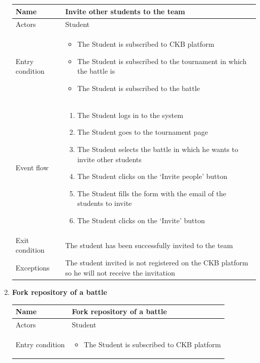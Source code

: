 \begin{enumerate}[label=UC\arabic*:]
    \begin{tabular}{|p{3cm}|p{8cm}|}
        \hline
        Name & Invite other students to the team \\
        \hline
        Actors & Student \\
        \hline
        Entry condition &
        \begin{itemize}
            \item The Student is subscribed to CKB platform
            \item The Student is subscribed to the tournament in which the battle is
            \item The Student is subscribed to the battle
        \end{itemize} \\
        \hline
        Event flow &
        \begin{enumerate}[label=\arabic*.]
            \item The Student logs in to the system
            \item The Student goes to the tournament page
            \item The Student selects the battle in which he wants to invite other students
            \item The Student clicks on the `Invite people' button
            \item The Student fills the form with the email of the students to invite
            \item The Student clicks on the `Invite' button
        \end{enumerate} \\
        \hline
        Exit condition & The student has been successfully invited to the team \\
        \hline
        Exceptions & The student invited is not registered on the CKB platform so he will not receive the invitation \\
        \hline
    \end{tabular}
    \item \textbf{Fork repository of a battle} \\
    \begin{tabular}{|p{3cm}|p{8cm}|}
        \hline
        Name & Fork repository of a battle \\
        \hline
        Actors & Student \\
        \hline
        Entry condition &
        \begin{itemize}
            \item The Student is subscribed to CKB platform

\end{itemize}
\end{tabular}
\end{enumerate}

